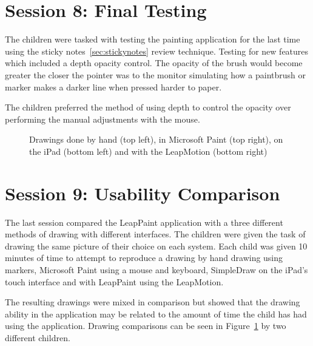 \section{Session 8: Final Testing}\label{session8}

The children were tasked with testing the painting application for the last time using the sticky notes~\ref{sec:stickynotes} review technique. Testing for new features which included a depth opacity control. The opacity of the brush would become greater the closer the pointer was to the monitor simulating how a paintbrush or marker makes a darker line when pressed harder to paper. 

The children preferred the method of using depth to control the opacity over performing the manual adjustments with the mouse. 
\begin{figure}
\centering     %
{}
\caption{Drawings done by hand (top left), in Microsoft Paint (top right), on the iPad (bottom left) and with the LeapMotion (bottom right)}
\label{fig:comparisondrawing}
\end{figure}

\section{Session 9: Usability Comparison}\label{session9}
The last session compared the LeapPaint application with a three different methods of drawing with different interfaces. The children were given the task of drawing the same picture of their choice on each system. Each child was given 10 minutes of time to attempt to reproduce a drawing by hand drawing using markers, Microsoft Paint using a mouse and keyboard, SimpleDraw on the iPad's touch interface and with LeapPaint using the LeapMotion. 

The resulting drawings were mixed in comparison but showed that the drawing ability in the application may be related to the amount of time the child has had using the application. Drawing comparisons can be seen in Figure~\ref{fig:comparisondrawing} by two different children. 



